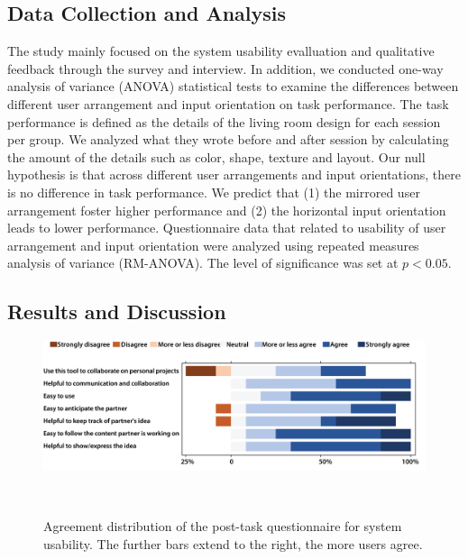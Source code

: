 \documentclass{sigchi}
\begin{document}
\subsection{Data Collection and Analysis}
The study mainly focused on the system usability evalluation and qualitative feedback through the survey and interview. In addition, we conducted one-way analysis of variance (ANOVA) statistical tests to examine the differences between different user arrangement and input orientation on task performance. The task performance is defined as the details of the living room design for each session per group. We analyzed what they wrote before and after session by calculating the amount of the details such as color, shape, texture and layout. Our null hypothesis is that across different user arrangements and input orientations, there is no difference in task performance. We predict that (1) the mirrored user arrangement foster higher performance and (2) the horizontal input orientation leads to lower performance. Questionnaire data that related to usability of user arrangement and input orientation were analyzed using repeated measures analysis of variance (RM-ANOVA). The level of significance was set at $p<0.05$.

\subsection{Results and Discussion} 
\begin{figure}[tb!]
 \centering
 \includegraphics[width=0.98\columnwidth]{usability.png}
 \caption{Agreement distribution of the post-task questionnaire for system usability. The further bars extend to the right, the more users agree.
 }~\label{fig:usability}
\end{figure}
\end{document}
